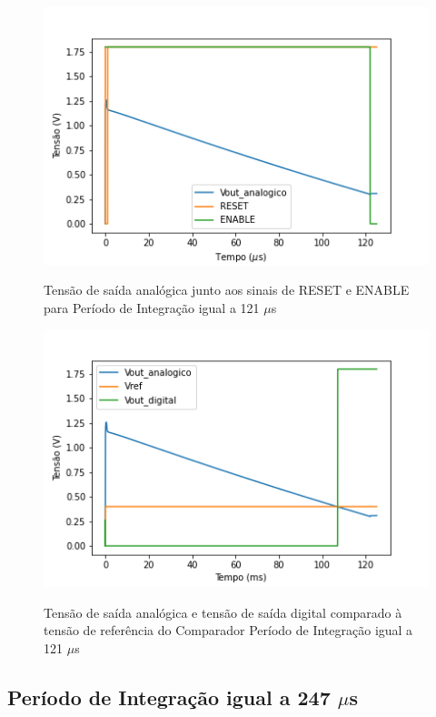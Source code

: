 \begin{figure}[htb]
 \centering
    \centering
    \caption{Tensão de saída analógica junto aos sinais de RESET e ENABLE para Período de Integração igual a 121 $\mu$s}
    \includegraphics[scale=1]{Resultados/Graficos/reseteenable-tb_pixel125.png}
    \label{graf125}
\end{figure}

\begin{figure}[htb]
 \centering
    \caption{Tensão de saída analógica e tensão de saída digital comparado à tensão de referência do Comparador Período de Integração igual a 121 $\mu$s} 
    \includegraphics[scale=1]{Resultados/Graficos/analogicoedigital-tb_pixel125.png}
    \label{graf1252}
\end{figure}

\subsection{Período de Integração igual a 247 $\mu$s}


